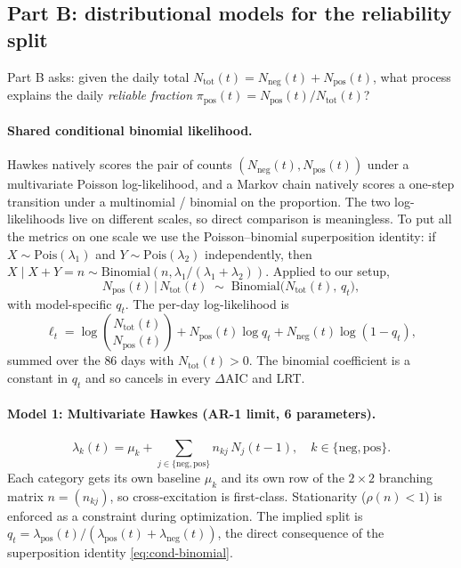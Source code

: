 \documentclass[11pt]{article}
\newcommand{\Npos}{N_{\mathrm{pos}}}
\newcommand{\Nneg}{N_{\mathrm{neg}}}
\newcommand{\Ntot}{N_{\mathrm{tot}}}
\newcommand{\pipos}{\pi_{\mathrm{pos}}}
\newcommand{\lampos}{\lambda_{\mathrm{pos}}}
\newcommand{\lamneg}{\lambda_{\mathrm{neg}}}
\begin{document}
\subsection{Part B: distributional models for the reliability split}
\label{sec:partB-models}

Part B asks: given the daily total $\Ntot(t)=\Nneg(t)+\Npos(t)$, what process
explains the daily \emph{reliable fraction} $\pipos(t)=\Npos(t)/\Ntot(t)$?

\paragraph{Shared conditional binomial likelihood.}
Hawkes natively scores the pair of counts $(\Nneg(t),\Npos(t))$ under a
multivariate Poisson log-likelihood, and a Markov chain natively scores a
one-step transition under a multinomial / binomial on the proportion. The
two log-likelihoods live on different scales, so direct comparison is
meaningless. To put all the metrics on one scale we use the
Poisson--binomial superposition identity: if
$X\sim\mathrm{Pois}(\lambda_1)$ and $Y\sim\mathrm{Pois}(\lambda_2)$
independently, then
$X\mid X+Y=n \sim \mathrm{Binomial}(n, \lambda_1/(\lambda_1+\lambda_2))$.
Applied to our setup,
\begin{equation}
  \Npos(t)\,\bigl|\,\Ntot(t)\;\sim\;\mathrm{Binomial}\bigl(\Ntot(t),\,q_t\bigr),
  \label{eq:cond-binomial}
\end{equation}
with model-specific $q_t$. The per-day log-likelihood is
\begin{equation}
  \ell_t = \log\binom{\Ntot(t)}{\Npos(t)}
         + \Npos(t)\log q_t + \Nneg(t)\log(1-q_t),
  \label{eq:binom-LL}
\end{equation}
summed over the $86$ days with $\Ntot(t)>0$. The binomial coefficient is a
constant in $q_t$ and so cancels in every $\Delta\mathrm{AIC}$ and LRT.

\paragraph{Model 1: Multivariate Hawkes (AR-1 limit, 6 parameters).}
\begin{equation}
  \lambda_k(t) = \mu_k + \sum_{j\in\{\mathrm{neg},\mathrm{pos}\}} n_{kj}\,N_j(t-1),
  \quad k\in\{\mathrm{neg},\mathrm{pos}\}.
  \label{eq:mvhawkes}
\end{equation}
Each category gets its own baseline $\mu_k$ and its own row of the
$2{\times}2$ branching matrix $n=(n_{kj})$, so cross-excitation is
first-class. Stationarity ($\rho(n)<1$) is enforced as a constraint during
optimization. The implied split is
$q_t=\lampos(t)/(\lampos(t)+\lamneg(t))$, the direct consequence of the
superposition identity \eqref{eq:cond-binomial}.
\end{document}
